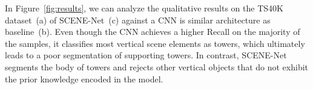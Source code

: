 \documentclass[final,supplement,onefignum,onetabnum]{siamonline171218}
\begin{document}
In Figure~\ref{fig:results}, we can analyze the qualitative results on the TS40K dataset~(a) of SCENE-Net~(c) against a CNN is similar architecture as baseline~(b).
Even though the CNN achieves a higher Recall on the majority of the samples, it classifies most vertical scene elements as towers, which ultimately leads to a poor segmentation of supporting towers.
In contrast, SCENE-Net segments the body of towers and rejects other vertical objects that do not exhibit the prior knowledge encoded in the model.


\begin{figure}[t]
\centering
{}
    \addtocounter{subfigure}{-1}
    \addtocounter{subfigure}{-1}
    \addtocounter{subfigure}{-1}
    

\end{figure}
\end{document}
